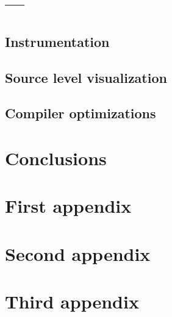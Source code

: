 \documentclass[11pt,english,openright]{book}
\begin{document}


\chapter{---\label{chap:third-chapter}}
\section{Instrumentation}
\section{Source level visualization}
\section{Compiler optimizations}



\chapter*{Conclusions\label{chap:conclusion}}


%
%
\printbibliography

\appendix

\chapter{First appendix\label{app:first-appendix}}



\chapter{Second appendix\label{app:second-appendix}}



\chapter{Third appendix\label{app:third-appendix}}




\printindex{}
\end{document}
